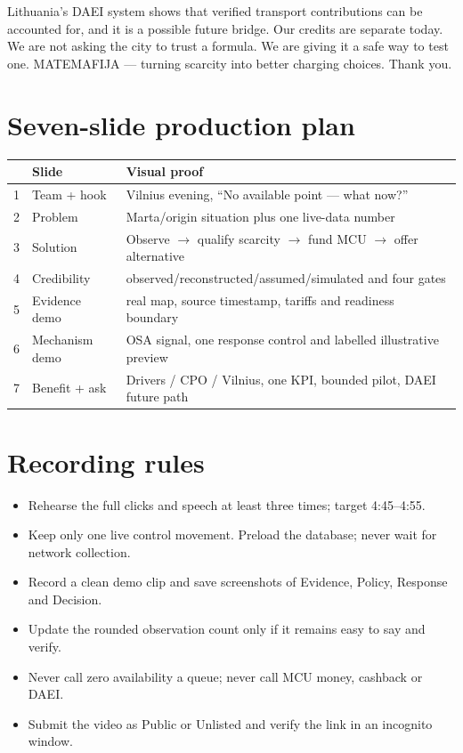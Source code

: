 \documentclass[11pt,a4paper]{article}
\begin{document}
Lithuania's DAEI system shows that verified transport contributions can be accounted for, and it is a possible future bridge. Our credits are separate today. We are not asking the city to trust a formula. We are giving it a safe way to test one. MATEMAFIJA --- turning scarcity into better charging choices. Thank you.

\newpage
\section*{Seven-slide production plan}
\begin{tabularx}{\textwidth}{p{1.0cm}p{4.0cm}X}
\toprule & Slide & Visual proof \\\midrule
1 & Team + hook & Vilnius evening, ``No available point --- what now?'' \\
2 & Problem & Marta/origin situation plus one live-data number \\
3 & Solution & Observe $\to$ qualify scarcity $\to$ fund MCU $\to$ offer alternative \\
4 & Credibility & observed/reconstructed/assumed/simulated and four gates \\
5 & Evidence demo & real map, source timestamp, tariffs and readiness boundary \\
6 & Mechanism demo & OSA signal, one response control and labelled illustrative preview \\
7 & Benefit + ask & Drivers / CPO / Vilnius, one KPI, bounded pilot, DAEI future path \\
\bottomrule
\end{tabularx}

\section*{Recording rules}
\begin{itemize}
\item Rehearse the full clicks and speech at least three times; target 4:45--4:55.
\item Keep only one live control movement. Preload the database; never wait for network collection.
\item Record a clean demo clip and save screenshots of Evidence, Policy, Response and Decision.
\item Update the rounded observation count only if it remains easy to say and verify.
\item Never call zero availability a queue; never call MCU money, cashback or DAEI.
\item Submit the video as Public or Unlisted and verify the link in an incognito window.
\end{itemize}
\end{document}
